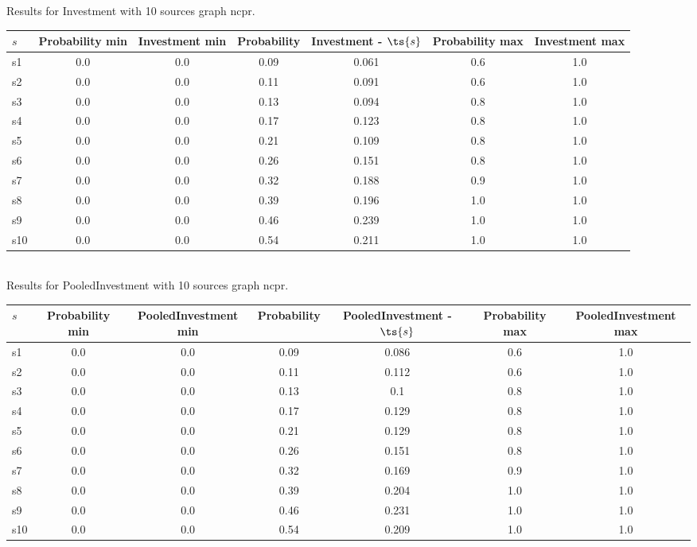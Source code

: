 \documentclass{article}
\begin{document}
\noindent Results for Investment with 10 sources graph ncpr.

\noindent\begin{tabular}{|l|c|c|c|c|c|c|}
\hline
$s$& Probability min & Investment min & Probability & Investment - $\ts{s}$ & Probability max & Investment max\\
\hline
s1 &0.0 & 0.0 & 0.09 & 0.061 & 0.6 & 1.0\\
\hline
s2 &0.0 & 0.0 & 0.11 & 0.091 & 0.6 & 1.0\\
\hline
s3 &0.0 & 0.0 & 0.13 & 0.094 & 0.8 & 1.0\\
\hline
s4 &0.0 & 0.0 & 0.17 & 0.123 & 0.8 & 1.0\\
\hline
s5 &0.0 & 0.0 & 0.21 & 0.109 & 0.8 & 1.0\\
\hline
s6 &0.0 & 0.0 & 0.26 & 0.151 & 0.8 & 1.0\\
\hline
s7 &0.0 & 0.0 & 0.32 & 0.188 & 0.9 & 1.0\\
\hline
s8 &0.0 & 0.0 & 0.39 & 0.196 & 1.0 & 1.0\\
\hline
s9 &0.0 & 0.0 & 0.46 & 0.239 & 1.0 & 1.0\\
\hline
s10 &0.0 & 0.0 & 0.54 & 0.211 & 1.0 & 1.0\\
\hline
\end{tabular}\\

\noindent Results for PooledInvestment with 10 sources graph ncpr.

\noindent\begin{tabular}{|l|c|c|c|c|c|c|}
\hline
$s$& Probability min & PooledInvestment min & Probability & PooledInvestment - $\ts{s}$ & Probability max & PooledInvestment max\\
\hline
s1 &0.0 & 0.0 & 0.09 & 0.086 & 0.6 & 1.0\\
\hline
s2 &0.0 & 0.0 & 0.11 & 0.112 & 0.6 & 1.0\\
\hline
s3 &0.0 & 0.0 & 0.13 & 0.1 & 0.8 & 1.0\\
\hline
s4 &0.0 & 0.0 & 0.17 & 0.129 & 0.8 & 1.0\\
\hline
s5 &0.0 & 0.0 & 0.21 & 0.129 & 0.8 & 1.0\\
\hline
s6 &0.0 & 0.0 & 0.26 & 0.151 & 0.8 & 1.0\\
\hline
s7 &0.0 & 0.0 & 0.32 & 0.169 & 0.9 & 1.0\\
\hline
s8 &0.0 & 0.0 & 0.39 & 0.204 & 1.0 & 1.0\\
\hline
s9 &0.0 & 0.0 & 0.46 & 0.231 & 1.0 & 1.0\\
\hline
s10 &0.0 & 0.0 & 0.54 & 0.209 & 1.0 & 1.0\\
\hline
\end{tabular}\\
\end{document}
